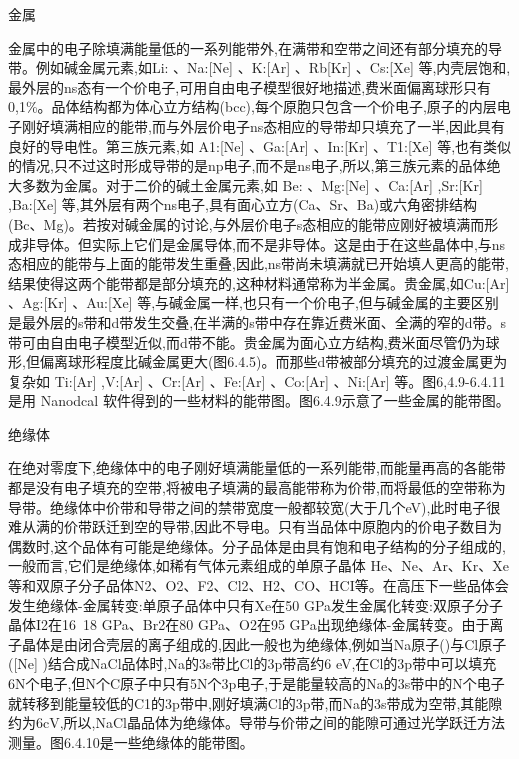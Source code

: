 金属

金属中的电子除填满能量低的一系列能带外,在满带和空带之间还有部分填充的导带。例如碱金属元素,如Li: 、Na:[Ne] 、K:[Ar] 、Rb[Kr] 、Cs:[Xe] 等,内壳层饱和,最外层的ns态有一个价电子,可用自由电子模型很好地描述,费米面偏离球形只有0,1\%。品体结构都为体心立方结构(bcc),每个原胞只包含一个价电子,原子的内层电子刚好填满相应的能带,而与外层价电子ns态相应的导带却只填充了一半,因此具有良好的导电性。第三族元素,如 A1:[Ne] 、Ga:[Ar] 、In:[Kr] 、T1:[Xe] 等,也有类似的情况,只不过这时形成导带的是np电子,而不是ns电子,所以,第三族元素的品体绝大多数为金属。对于二价的碱土金属元素,如 Be: 、Mg:[Ne] 、Ca:[Ar] ,Sr:[Kr]  ,Ba:[Xe]  等,其外层有两个ns电子,具有面心立方(Ca、Sr、Ba)或六角密排结构(Bc、Mg)。若按对碱金属的讨论,与外层价电子s态相应的能带应刚好被填满而形成非导体。但实际上它们是金属导体,而不是非导体。这是由于在这些晶体中,与ns态相应的能带与上面的能带发生重叠,因此,ns带尚未填满就已开始填人更高的能带,结果使得这两个能带都是部分填充的,这种材料通常称为半金属。贵金属,如Cu:[Ar] 、Ag:[Kr] 、Au:[Xe] 等,与碱金属一样,也只有一个价电子,但与碱金属的主要区别是最外层的s带和d带发生交叠,在半满的s带中存在靠近费米面、全满的窄的d带。s带可由自由电子模型近似,而d带不能。贵金属为面心立方结构,费米面尽管仍为球形,但偏离球形程度比碱金属更大(图6.4.5)。而那些d带被部分填充的过渡金属更为复杂如 Ti:[Ar] ,V:[Ar] 、Cr:[Ar] 、Fe:[Ar] 、Co:[Ar] 、Ni:[Ar] 等。图6,4.9-6.4.11是用 Nanodcal 软件得到的一些材料的能带图。图6.4.9示意了一些金属的能带图。



绝缘体

在绝对零度下,绝缘体中的电子刚好填满能量低的一系列能带,而能量再高的各能带都是没有电子填充的空带,将被电子填满的最高能带称为价带,而将最低的空带称为导带。绝缘体中价带和导带之间的禁带宽度一般都较宽(大于几个eV),此时电子很难从满的价带跃迁到空的导带,因此不导电。只有当品体中原胞内的价电子数目为偶数时,这个品体有可能是绝缘体。分子品体是由具有饱和电子结构的分子组成的,一般而言,它们是绝缘体,如稀有气体元素组成的单原子晶体 He、Ne、Ar、Kr、Xe等和双原子分子品体N2、O2、F2、Cl2、H2、CO、HCI等。在高压下一些品体会发生绝缘体-金属转变:单原子品体中只有Xe在50 GPa发生金属化转变:双原子分子晶体I2在16~18 GPa、Br2在80 GPa、O2在95 GPa出现绝缘体-金属转变。由于离子晶体是由闭合壳层的离子组成的,因此一般也为绝缘体,例如当Na原子()与Cl原子([Ne] )结合成NaCl品体时,Na的3s带比Cl的3p带高约6 eV,在Cl的3p带中可以填充6N个电子,但N个C原子中只有5N个3p电子,于是能量较高的Na的3s带中的N个电子就转移到能量较低的C1的3p带中,刚好填满Cl的3p带,而Na的3s带成为空带,其能隙约为6cV,所以,NaCl晶品体为绝缘体。导带与价带之间的能隙可通过光学跃迁方法测量。图6.4.10是一些绝缘体的能带图。



